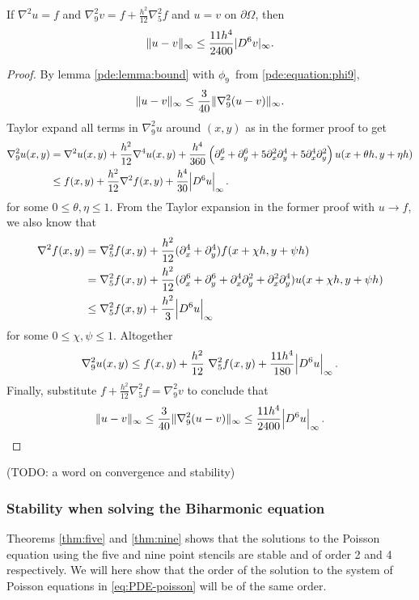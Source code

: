 \begin{theorem}\label{thm:nine}
If $\nabla^2 u = f$ and $\nabla_9^2 v = f + \frac{h^2}{12} \nabla_5^2 f$ and $u = v$ on $\partial \Omega$, then
$$
\lVert u - v \rVert_\infty \leq \frac{11h^4}{2400} \lvert D^6 v\rvert_\infty.
$$
\end{theorem}
\begin{proof}
By lemma \ref{pde:lemma:bound} with $\phi_9$ from \ref{pde:equation:phi9},
$$
\lVert u - v \rVert_\infty \leq \frac{3}{40} \lVert \nabla_9^2 (u  - v) \rVert_\infty.
$$
Taylor expand all terms in $\nabla_9^2 u$ around $(x,y)$ as in the former proof to get
\begin{align*}
  \nabla_9^2 u(x,y) &= \nabla^2 u(x,y) + \frac{h^2}{12} \nabla^4 u(x,y) + \frac{h^4}{360} \left( \partial_x^6 + \partial_y^6 + 5 \partial_x^2 \partial_y^4 + 5 \partial_x^4 \partial_y^2 \right) u(x + \theta h,y + \eta h) \\
                    &\leq f(x,y)          + \frac{h^2}{12} \nabla^2 f(x,y) + \frac{h^4}{30} \abs{D^6 u}_\infty.
\end{align*}
for some $0 \leq \theta, \eta \leq 1$.
From the Taylor expansion in the former proof with $u \rightarrow f$, we also know that
\begin{align*}
	\nabla^2 f(x,y) &= \nabla_5^2 f(x,y) + \frac{h^2}{12} (\partial_x^4 + \partial_y^4) f(x + \chi h,y + \psi h) \\
	&= \nabla_5^2 f(x,y) + \frac{h^2}{12} (\partial_x^6 + \partial_y^6 + \partial_x^4 \partial_y^2 + \partial_x^2 \partial_y^4) u(x + \chi h,y + \psi h) \\
	&\leq \nabla_5^2 f(x,y) + \frac{h^2}{3} \abs{D^6 u}_\infty
\end{align*}
for some $0 \leq \chi, \psi \leq 1$. Altogether
\begin{equation*}
	\nabla_9^2 u(x,y) \leq f(x,y) + \frac{h^2}{12} \nabla_5^2 f(x,y) + \frac{11 h^4}{180} \abs{D^6 u}_\infty.
\end{equation*}
Finally, substitute $f + \frac{h^2}{12} \nabla_5^2 f = \nabla_9^2 v$ to conclude that
\begin{equation*}
  \lVert u-v \rVert_\infty \leq \frac{3}{40} \lVert \nabla_9^2 (u - v) \rVert_\infty \leq \frac{11 h^4}{2400} \abs{D^6 u}_\infty. \qedhere
\end{equation*}
\end{proof}

(TODO: a word on convergence and stability)

\subsubsection{Stability when solving the Biharmonic equation}
Theorems \ref{thm:five} and \ref{thm:nine} shows that the solutions to the Poisson equation using the five and nine point stencils are stable and of order 2 and 4 respectively.
We will here show that the order of the solution to the system of Poisson equations in \eqref{eq:PDE-poisson} will be of the same order.


